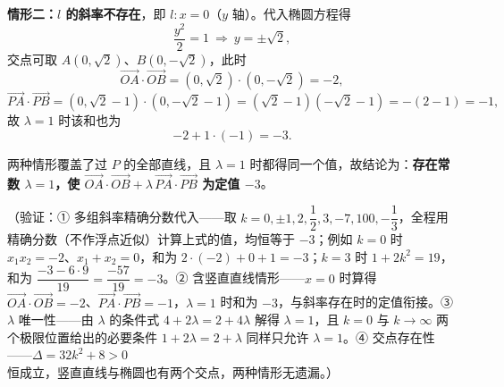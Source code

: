\begin{answer}
\textbf{情形二：\(l\) 的斜率不存在}，即 \(l:x=0\)（\(y\) 轴）。代入椭圆方程得
\nopagebreak[4]
\[
\frac{y^{2}}{2}=1\ \Longrightarrow\ y=\pm\sqrt{2},
\]
交点可取 \(A(0,\sqrt{2})\)、\(B(0,-\sqrt{2})\)，此时
\nopagebreak[4]
\[
\overrightarrow{OA}\cdot\overrightarrow{OB}=(0,\sqrt{2})\cdot(0,-\sqrt{2})=-2,
\]
\nopagebreak[4]
\[
\overrightarrow{PA}\cdot\overrightarrow{PB}=(0,\sqrt{2}-1)\cdot(0,-\sqrt{2}-1)=(\sqrt{2}-1)(-\sqrt{2}-1)=-(2-1)=-1,
\]
故 \(\lambda=1\) 时该和也为
\nopagebreak[4]
\[
-2+1\cdot(-1)=-3 .
\]

两种情形覆盖了过 \(P\) 的全部直线，且 \(\lambda=1\) 时都得同一个值，故结论为：\textbf{存在常数 \(\lambda=1\)，使 \(\overrightarrow{OA}\cdot\overrightarrow{OB}+\lambda\,\overrightarrow{PA}\cdot\overrightarrow{PB}\) 为定值 \(-3\)}。

（验证：① 多组斜率精确分数代入——取 \(k=0,\pm1,2,\dfrac{1}{2},3,-7,100,-\dfrac{1}{3}\)，全程用精确分数（不作浮点近似）计算上式的值，均恒等于 \(-3\)；例如 \(k=0\) 时 \(x_{1}x_{2}=-2\)、\(x_{1}+x_{2}=0\)，和为 \(2\cdot(-2)+0+1=-3\)；\(k=3\) 时 \(1+2k^{2}=19\)，和为 \(\dfrac{-3-6\cdot9}{19}=\dfrac{-57}{19}=-3\)。② 含竖直直线情形——\(x=0\) 时算得 \(\overrightarrow{OA}\cdot\overrightarrow{OB}=-2\)、\(\overrightarrow{PA}\cdot\overrightarrow{PB}=-1\)，\(\lambda=1\) 时和为 \(-3\)，与斜率存在时的定值衔接。③ \(\lambda\) 唯一性——由 \(\lambda\) 的条件式 \(4+2\lambda=2+4\lambda\) 解得 \(\lambda=1\)，且 \(k=0\) 与 \(k\to\infty\) 两个极限位置给出的必要条件 \(1+2\lambda=2+\lambda\) 同样只允许 \(\lambda=1\)。④ 交点存在性——\(\Delta=32k^{2}+8>0\) 恒成立，竖直直线与椭圆也有两个交点，两种情形无遗漏。）



\end{answer}
